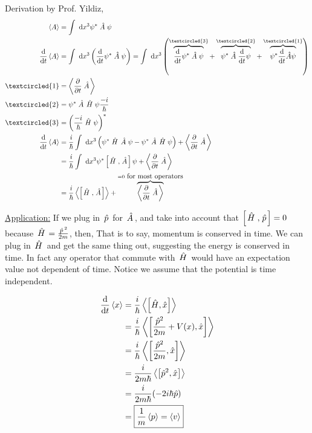 \documentclass{school-22.101-notes}
\begin{document}
Derivation by Prof. Yildiz,
\begin{align}
\expect{A} &= \int \dx^3 \psi^* \Ahat \psi \\
\ddt \expect{A} &= \int \dx^3 \left( \ddt \psi^* \Ahat \psi \right) = \int \dx^3 \left( \overbrace{\ddt \psi^* \Ahat \psi}^{\textcircled{3}} + \overbrace{\psi^* \Ahat \ddt \psi}^{\textcircled{2}} + \overbrace{\psi^* \ddt \hat{A} \psi}^{\textcircled{1}} \right) \\
\textcircled{1} &= \expect{\ppt \Ahat} \\
\textcircled{2} &= \psi^* \Ahat \Hhat \psi \frac{-i}{\hbar}  \\
\textcircled{3} &= \left( \frac{-i}{\hbar}\Hhat \psi \right)^* \\
\ddt \expect{A} &= \frac{i}{\hbar} \int \dx^3 \left( \psi^* \Hhat \Ahat \psi  - \psi^* \Ahat \Hhat \psi \right) + \expect{\ppt \Ahat} \\
&= \frac{i}{\hbar} \int \dx^3 \psi^* \left[ \Hhat, \Ahat \right] \psi + \expect{\ppt \Ahat} \\
&= \frac{i}{\hbar} \expect{ \left[ \Hhat, \Ahat \right] } + \overbrace{\expect{\ppt \Ahat}}^{=0\mbox{ for most operators}} 
\end{align}

\uline{Application:} If we plug in $\left. \hat{p} \right.$ for $\left. \hat{A} \right.$, and take into account that $\left[ \left. \hat{H} \right., \left. \hat{p} \right. \right] = 0$ because $\left. \hat{H} \right. = \frac{\left. \hat{p} \right.^2}{2m}$, then,
That is to say, momentum is conserved in time. We can plug in $\left. \hat{H} \right.$ and get the same thing out, suggesting the energy is conserved in time. In fact any operator that commute with $\left. \hat{H} \right.$ would have an expectation value not dependent of time.  Notice we assume that the potential is time independent. 



\begin{align}
\frac{\mathrm{d}}{\mathrm{d}t} \left< x \right> &= \frac{i}{\hbar} \left< \left[ \hat{H}, \hat{x} \right] \right> \\
&= \frac{i}{\hbar} \left< \left[ \frac{\hat{p}^2}{2m} + V(x), \hat{x} \right] \right> \\
&= \frac{i}{\hbar} \left< \left[ \frac{\hat{p}^2}{2m} , \hat{x} \right] \right> \\
&= \frac{i}{2m\hbar} \left< \left[ \hat{p}^2 , \hat{x} \right] \right> \\
&= \frac{i}{2m\hbar} (-2i\hbar \hat{p} ) \\
&= \boxed{\frac{1}{m} \left< p \right> = \left< v \right>}
\end{align}
\end{document}
